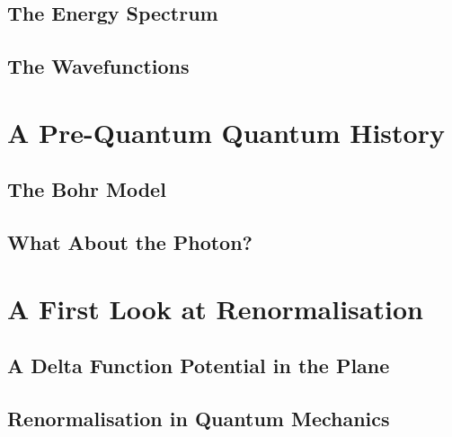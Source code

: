 \documentclass{book}
\begin{document}
\subsection{The Energy Spectrum}
\subsection{The Wavefunctions}
\section{A Pre-Quantum Quantum History}
\subsection{The Bohr Model}
\subsection{What About the Photon?}
\section{A First Look at Renormalisation}
\subsection{A Delta Function Potential in the Plane}
\subsection{Renormalisation in Quantum Mechanics}
\end{document}

